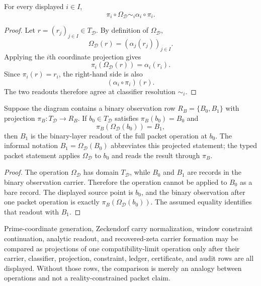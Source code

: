 \begin{theorem}
\label{thm:self-similar-operations-coordinate-projections}
For every displayed $i\in I$,
$$
\pi_i\circ\Omega_{\mathcal D}
\sim_i
\alpha_i\circ\pi_i.
$$
\end{theorem}

\begin{proof}
Let $r=(r_j)_{j\in I}\in T_{\mathcal D}$. By definition of
$\Omega_{\mathcal D}$,
$$
\Omega_{\mathcal D}(r)=(\alpha_j(r_j))_{j\in I}.
$$
Applying the $i$th coordinate projection gives
$$
\pi_i(\Omega_{\mathcal D}(r))=\alpha_i(r_i).
$$
Since $\pi_i(r)=r_i$, the right-hand side is also
$$
(\alpha_i\circ\pi_i)(r).
$$
The two readouts therefore agree at classifier resolution $\sim_i$.
\end{proof}

\begin{corollary}
\label{cor:binary-observation-projected-operation}
Suppose the diagram contains a binary observation row
$R_B=\{B_0,B_1\}$ with projection $\pi_B:T_{\mathcal D}\to R_B$. If
$b_0\in T_{\mathcal D}$ satisfies $\pi_B(b_0)=B_0$ and
$$
\pi_B(\Omega_{\mathcal D}(b_0))=B_1,
$$
then $B_1$ is the binary-layer readout of the full packet operation at
$b_0$. The informal notation $B_1=\Omega_{\mathcal D}(B_0)$ abbreviates
this projected statement; the typed packet statement applies
$\Omega_{\mathcal D}$ to $b_0$ and reads the result through $\pi_B$.
\end{corollary}

\begin{proof}
The operation $\Omega_{\mathcal D}$ has domain $T_{\mathcal D}$, while
$B_0$ and $B_1$ are records in the binary observation carrier. Therefore
the operation cannot be applied to $B_0$ as a bare record. The displayed
source point is $b_0$, and the binary observation after one packet
operation is exactly $\pi_B(\Omega_{\mathcal D}(b_0))$. The assumed
equality identifies that readout with $B_1$.
\end{proof}

\begin{principle}
\label{prin:packet-level-common-self-similarity}
Prime-coordinate generation, Zeckendorf carry normalization, window
constraint continuation, analytic readout, and recovered-zeta carrier
formation may be compared as projections of one compatibility-limit
operation only after their carrier, classifier, projection, constraint,
ledger, certificate, and audit rows are all displayed. Without those rows,
the comparison is merely an analogy between operations and not a
reality-constrained packet claim.
\end{principle}

